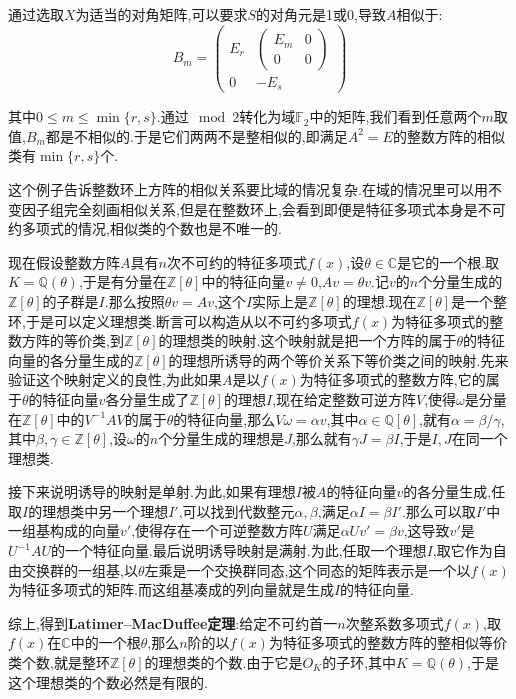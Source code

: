 通过选取$X$为适当的对角矩阵,可以要求$S$的对角元是1或0,导致$A$相似于:
$$B_m=\left(\begin{array}{cc}
E_r&\left(\begin{array}{cc}
E_m&0\\
0&0\end{array}\right)\\
0&-E_s\end{array}\right)$$

其中$0\le m\le\min\{r,s\}$.通过$\mod2$转化为域$\mathbb{F}_2$中的矩阵,我们看到任意两个$m$取值,$B_m$都是不相似的.于是它们两两不是整相似的,即满足$A^2=E$的整数方阵的相似类有$\min\{r,s\}$个.

这个例子告诉整数环上方阵的相似关系要比域的情况复杂.在域的情况里可以用不变因子组完全刻画相似关系,但是在整数环上,会看到即便是特征多项式本身是不可约多项式的情况,相似类的个数也是不唯一的.

现在假设整数方阵$A$具有$n$次不可约的特征多项式$f(x)$,设$\theta\in\mathbb{C}$是它的一个根.取$K=\mathbb{Q}(\theta)$,于是有分量在$\mathbb{Z}[\theta]$中的特征向量$v\not=0$,$Av=\theta v$.记$v$的$n$个分量生成的$\mathbb{Z}[\theta]$的子群是$I$.那么按照$\theta v=Av$,这个$I$实际上是$\mathbb{Z}[\theta]$的理想.现在$\mathbb{Z}[\theta]$是一个整环,于是可以定义理想类.断言可以构造从以不可约多项式$f(x)$为特征多项式的整数方阵的等价类,到$\mathbb{Z}[\theta]$的理想类的映射.这个映射就是把一个方阵的属于$\theta$的特征向量的各分量生成的$\mathbb{Z}[\theta]$的理想所诱导的两个等价关系下等价类之间的映射.先来验证这个映射定义的良性,为此如果$A$是以$f(x)$为特征多项式的整数方阵,它的属于$\theta$的特征向量$v$各分量生成了$\mathbb{Z}[\theta]$的理想$I$,现在给定整数可逆方阵$V$,使得$\omega$是分量在$\mathbb{Z}[\theta]$中的$V^{-1}AV$的属于$\theta$的特征向量,那么$V\omega=\alpha v$,其中$\alpha\in\mathbb{Q}[\theta]$,就有$\alpha=\beta/\gamma$,其中$\beta,\gamma\in\mathbb{Z}[\theta]$,设$\omega$的$n$个分量生成的理想是$J$,那么就有$\gamma J=\beta I$,于是$I,J$在同一个理想类.

接下来说明诱导的映射是单射.为此,如果有理想$I$被$A$的特征向量$v$的各分量生成,任取$I$的理想类中另一个理想$I'$,可以找到代数整元$\alpha,\beta$,满足$\alpha I=\beta I'$.那么可以取$I'$中一组基构成的向量$v'$,使得存在一个可逆整数方阵$U$满足$\alpha Uv'=\beta v$,这导致$v'$是$U^{-1}AU$的一个特征向量.最后说明诱导映射是满射.为此,任取一个理想$I$,取它作为自由交换群的一组基,以$\theta$左乘是一个交换群同态,这个同态的矩阵表示是一个以$f(x)$为特征多项式的矩阵.而这组基凑成的列向量就是生成$I$的特征向量.

综上,得到\textbf{Latimer–MacDuffee定理}:给定不可约首一$n$次整系数多项式$f(x)$,取$f(x)$在$\mathbb{C}$中的一个根$\theta$,那么$n$阶的以$f(x)$为特征多项式的整数方阵的整相似等价类个数,就是整环$\mathbb{Z}[\theta]$的理想类的个数.由于它是$O_K$的子环,其中$K=\mathbb{Q}(\theta)$,于是这个理想类的个数必然是有限的.
\newpage
